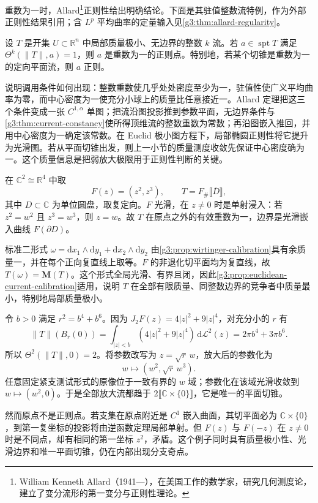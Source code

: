 \ProseParagraphBreak
重数为一时，Allard\footnote{William Kenneth Allard（1941—），在美国工作的数学家，研究几何测度论，建立了变分流形的第一变分与正则性理论。}正则性给出明确结论。下面是其驻值整数流特例，作为外部正则性结果引用\cite[定理24.2，第125--128页；定理36.3，第211--212页]{Simon1983}；含 \(L^p\) 平均曲率的定量输入见\cref{g3:thm:allard-regularity}。

\begin{theorem}\label{g3:thm:unit-density-minimizing-current-regularity}
	设 \(T\) 是开集 \(U\subset\mathbb R^n\) 中局部质量极小、无边界的整数 \(k\) 流。若 \(a\in\operatorname{spt}T\) 满足
	\(\Theta^k(\|T\|,a)=1\)，则 \(a\) 是重数为一的正则点。特别地，若某个切锥是重数为一的定向平面流，则 \(a\) 正则。
\end{theorem}

说明调用条件如何出现：整数重数使几乎处处密度至少为一，驻值性使广义平均曲率为零，而中心密度为一使充分小球上的质量比任意接近一。Allard 定理把这三个条件变成一张 \(C^{1,\alpha}\) 单图；把流沿图投影推到参数平面，无边界条件与\cref{g3:thm:current-constancy}使所得顶维流的整数重数为常数；再沿图嵌入推回，并用中心密度为一确定该常数。在 Euclid 极小图方程下，局部椭圆正则性将它提升为光滑图。若从平面切锥出发，则上一小节的质量测度收敛先保证中心密度确为一。这个质量信息是把弱放大极限用于正则性判断的关键。

\begin{example}\label{g3:exm:complex-cusp-current}
	在 \(\mathbb C^2\cong\mathbb R^4\) 中取
	\[
		F(z)=(z^2,z^3),\qquad T=F_\#\lBrack\overline D\rBrack,
	\]
	其中 \(D\subset\mathbb C\) 为单位圆盘，取复定向。\(F\) 光滑，在 \(z\ne0\) 时是单射浸入：若 \(z^2=w^2\) 且 \(z^3=w^3\)，则 \(z=w\)。故 \(T\) 在原点之外的有效重数为一，边界是光滑嵌入曲线 \(F(\partial D)\)。

	标准二形式
	\(\omega=\mathrm dx_1\wedge\mathrm dy_1+\mathrm dx_2\wedge\mathrm dy_2\)
	由\cref{g3:prop:wirtinger-calibration}具有余质量一，并在每个正向复直线上取等。\(F\) 的非退化切平面均为复直线，故 \(T(\omega)=\mathbf M(T)\)。这个形式全局光滑、有界且闭，因此\cref{g3:prop:euclidean-current-calibration}适用，说明 \(T\) 在全部有限质量、同整数边界的竞争者中质量最小，特别地局部质量极小。

	令 \(b>0\) 满足 \(r^2=b^4+b^6\)。因为
	\(J_2F(z)=4|z|^2+9|z|^4\)，对充分小的 \(r\) 有
	\[
		\|T\|(B_r(0))
		=\int_{|z|<b}(4|z|^2+9|z|^4)\,\mathrm d\mathcal L^2(z)
		=2\pi b^4+3\pi b^6.
	\]
	所以 \(\Theta^2(\|T\|,0)=2\)。将参数改写为 \(z=\sqrt r\,w\)，放大后的参数化为
	\[
		w\longmapsto(w^2,\sqrt r\,w^3).
	\]
	任意固定紧支测试形式的原像位于一致有界的 \(w\) 域；参数化在该域光滑收敛到 \(w\mapsto(w^2,0)\)。于是全部放大流都趋于 \(2\lBrack\mathbb C\times\{0\}\rBrack\)，它是唯一的平面切锥。

	然而原点不是正则点。若支集在原点附近是 \(C^1\) 嵌入曲面，其切平面必为 \(\mathbb C\times\{0\}\)，到第一复坐标的投影将由逆函数定理局部单射。但 \(F(z)\) 与 \(F(-z)\) 在 \(z\ne0\) 时是不同点，却有相同的第一坐标 \(z^2\)，矛盾。这个例子同时具有质量极小性、光滑边界和唯一平面切锥，仍在内部出现分支奇点。
\end{example}


